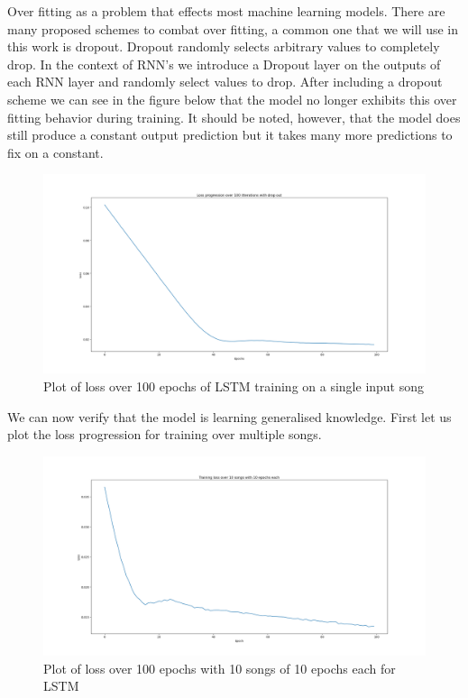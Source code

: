 \documentclass{article}
\begin{document}
Over fitting as a problem that effects most machine learning models. There are many proposed schemes to combat over fitting, a common one that we will use in this work is dropout. Dropout randomly selects arbitrary values to completely drop. In the context of RNN's we introduce a Dropout layer on the outputs of each RNN layer and randomly select values to drop. After including a dropout scheme we can see in the figure below that the model no longer exhibits this over fitting behavior during training. It should be noted, however, that the model does still produce a constant output prediction but it takes many more predictions to fix on a constant.
\begin{figure}[H]
\caption{Plot of loss over 100 epochs of LSTM training on a single input song}
\includegraphics[scale=0.35]{loss_dropout_100itr.png}
\end{figure}
We can now verify that the model is learning generalised knowledge. First let us plot the loss progression for training over multiple songs.
\begin{figure}[H]
\caption{Plot of loss over 100 epochs with 10 songs of 10 epochs each for LSTM}
\includegraphics[scale=0.35]{loss_plot_10songs.png}
\end{figure}
\end{document}
